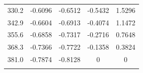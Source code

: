 \documentclass[12pt]{article}
\begin{document}
\begin{center}
\begin{tabular}{ccccc}
330.2                & -0.6096              & -0.6512              & -0.5432              & 1.5296               \\
342.9                & -0.6604              & -0.6913              & -0.4074              & 1.1472               \\
355.6                & -0.6858              & -0.7317              & -0.2716              & 0.7648               \\
368.3                & -0.7366              & -0.7722              & -0.1358              & 0.3824               \\
381.0                & -0.7874              & -0.8128              & 0                    & 0                    \\
\hline
\multicolumn{1}{l}{} & \multicolumn{1}{l}{} & \multicolumn{1}{l}{} & \multicolumn{1}{l}{} & \multicolumn{1}{l}{}
\end{tabular}
\end{center}

\newpage
\end{document}

